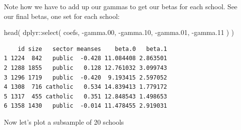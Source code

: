 \documentclass[
  letterpaper,
  DIV=11,
  numbers=noendperiod]{scrreprt}
\newenvironment{Shaded}{\begin{snugshade}}{\end{snugshade}}
\newcommand{\AttributeTok}[1]{\textcolor[rgb]{0.49,0.56,0.16}{#1}}
\newcommand{\DecValTok}[1]{\textcolor[rgb]{0.25,0.63,0.44}{#1}}
\newcommand{\FloatTok}[1]{\textcolor[rgb]{0.25,0.63,0.44}{#1}}
\newcommand{\FunctionTok}[1]{\textcolor[rgb]{0.02,0.16,0.49}{#1}}
\newcommand{\NormalTok}[1]{\textcolor[rgb]{0.00,0.44,0.13}{#1}}
\newcommand{\OtherTok}[1]{\textcolor[rgb]{0.00,0.44,0.13}{#1}}
\newcommand{\SpecialCharTok}[1]{\textcolor[rgb]{0.25,0.44,0.63}{#1}}
\begin{document}
Note how we have to add up our gammas to get our betas for each school.
See our final betas, one set for each school:

\begin{Shaded}
\begin{Highlighting}[]
\FunctionTok{head}\NormalTok{( dplyr}\SpecialCharTok{::}\FunctionTok{select}\NormalTok{( coefs, }\SpecialCharTok{{-}}\NormalTok{gamma}\FloatTok{.00}\NormalTok{, }\SpecialCharTok{{-}}\NormalTok{gamma}\FloatTok{.10}\NormalTok{, }\SpecialCharTok{{-}}\NormalTok{gamma}\FloatTok{.01}\NormalTok{, }\SpecialCharTok{{-}}\NormalTok{gamma}\FloatTok{.11}\NormalTok{ ) )}
\end{Highlighting}
\end{Shaded}

\begin{verbatim}
    id size   sector meanses    beta.0   beta.1
1 1224  842   public  -0.428 11.084408 2.863501
2 1288 1855   public   0.128 12.761032 3.099743
3 1296 1719   public  -0.420  9.193415 2.597052
4 1308  716 catholic   0.534 14.839413 1.779172
5 1317  455 catholic   0.351 12.848543 1.498653
6 1358 1430   public  -0.014 11.478455 2.919031
\end{verbatim}

Now let's plot a subsample of 20 schools

\begin{Shaded}
\end{Shaded}
\end{document}
